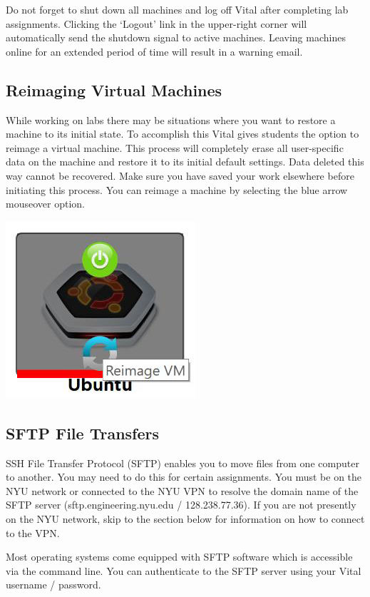 \documentclass[12pt]{article}
\begin{document}
Do not forget to shut down all machines and log off Vital after completing lab assignments. Clicking the ‘Logout’ link in the upper-right corner will automatically send the shutdown signal to active machines. Leaving machines online for an extended period of time will result in a warning email.

\subsection*{Reimaging Virtual Machines}
While working on labs there may be situations where you want to restore a machine to its initial state. To accomplish this Vital gives students the option to reimage a virtual machine. This process will completely erase all user-specific data on the machine and restore it to its initial default settings. Data deleted this way cannot be recovered. Make sure you have saved your work elsewhere before initiating this process. You can reimage a machine by selecting the blue arrow mouseover option.

{%
\centering
\includegraphics[scale=0.50]{reimage_vm.png}

}

\subsection*{SFTP File Transfers}
SSH File Transfer Protocol (SFTP) enables you to move files from one computer to another. You may need to do this for certain assignments. You must be on the NYU network or connected to the NYU VPN to resolve the domain name of the SFTP server (sftp.engineering.nyu.edu / 128.238.77.36). If you are not presently on the NYU network, skip to the section below for information on how to connect to the VPN.

Most operating systems come equipped with SFTP software which is accessible via the command line. You can authenticate to the SFTP server using your Vital username / password. 
\end{document}
